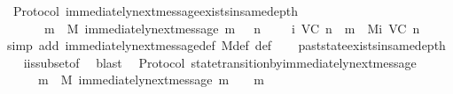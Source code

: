 \begin{isabellebody}
{\isafoldproof}%
%
\isadelimproof
\isanewline
%
\endisadelimproof
\isanewline
{}\isamarkupfalse%
\ {\isacharparenleft}\ Protocol{\isacharparenright}\ immediately{\isacharunderscore}next{\isacharunderscore}message{\isacharunderscore}exists{\isacharunderscore}in{\isacharunderscore}same{\isacharunderscore}depth{\isacharcolon}\ \isanewline
\ \ {\isachardoublequoteopen}{\isasymforall}\ {\isasymsigma}\ {\isasymin}\ {\isasymSigma}{\isachardot}\ {\isasymforall}\ m\ {\isasymin}\ M{\isachardot}\ immediately{\isacharunderscore}next{\isacharunderscore}message\ {\isacharparenleft}{\isasymsigma}{\isacharcomma}m{\isacharparenright}\ {\isasymlongrightarrow}\ {\isacharparenleft}{\isasymexists}\ n\ {\isasymin}\ {\isasymnat}{\isachardot}\ {\isasymsigma}\ {\isasymin}\ {\isasymSigma}i\ {\isacharparenleft}V{\isacharcomma}C{\isacharcomma}{\isasymepsilon}{\isacharparenright}\ n\ {\isasymand}\ m\ {\isasymin}\ Mi\ {\isacharparenleft}V{\isacharcomma}C{\isacharcomma}{\isasymepsilon}{\isacharparenright}\ n{\isacharparenright}{\isachardoublequoteclose}\isanewline
%
\isadelimproof
\ \ %
\endisadelimproof
%
\isatagproof
{}\isamarkupfalse%
\ {\isacharparenleft}simp\ add{\isacharcolon}\ immediately{\isacharunderscore}next{\isacharunderscore}message{\isacharunderscore}def\ M{\isacharunderscore}def\ {\isasymSigma}{\isacharunderscore}def{\isacharparenright}\isanewline
\ \ \isamarkupfalse%
\ past{\isacharunderscore}state{\isacharunderscore}exists{\isacharunderscore}in{\isacharunderscore}same{\isacharunderscore}depth\isanewline
\ \ \isamarkupfalse%
\ {\isasymSigma}i{\isacharunderscore}is{\isacharunderscore}subset{\isacharunderscore}of{\isacharunderscore}{\isasymSigma}\ \isamarkupfalse%
\ blast%
\endisatagproof
{\isafoldproof}%
%
\isadelimproof
\isanewline
%
\endisadelimproof
\isanewline
{}\isamarkupfalse%
\ {\isacharparenleft}\ Protocol{\isacharparenright}\ state{\isacharunderscore}transition{\isacharunderscore}by{\isacharunderscore}immediately{\isacharunderscore}next{\isacharunderscore}message{\isacharcolon}\ \isanewline
\ \ {\isachardoublequoteopen}{\isasymforall}\ {\isasymsigma}\ {\isasymin}{\isasymSigma}{\isachardot}\ {\isasymforall}\ m\ {\isasymin}\ M{\isachardot}\ immediately{\isacharunderscore}next{\isacharunderscore}message\ {\isacharparenleft}{\isasymsigma}{\isacharcomma}m{\isacharparenright}\ {\isasymlongrightarrow}\ {\isasymsigma}\ {\isasymunion}\ {\isacharbraceleft}m{\isacharbraceright}\ {\isasymin}\ {\isasymSigma}{\isachardoublequoteclose}\isanewline
%

\end{isabellebody}
